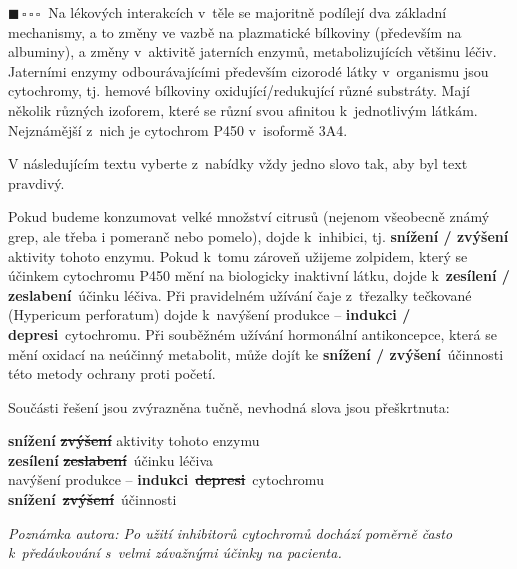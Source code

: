 \documentclass{book}
\newcommand{\jeden}{$\blacksquare \, \square \, \square \, \square \; \; $}
\renewenvironment{quotation}{\par}{\par} %
\begin{document}
\hrulefill %
\begin{quotation}
\jeden Na lékových interakcích v~těle se majoritně podílejí dva základní
mechanismy, a to změny ve vazbě na plazmatické bílkoviny (především
na albuminy), a změny v~aktivitě jaterních enzymů, metabolizujících většinu léčiv. Jaterními enzymy odbourávajícími především cizorodé látky v~organismu jsou cytochromy, tj. hemové bílkoviny oxidující/redukující různé substráty. Mají několik různých izoforem, které se různí svou
afinitou k~jednotlivým látkám. Nejznámější z~nich je cytochrom P450
v~isoformě 3A4. 

V následujícím textu vyberte z~nabídky vždy jedno slovo tak, aby byl text pravdivý.

Pokud budeme konzumovat velké množství citrusů (nejenom všeobecně
známý grep, ale třeba i pomeranč nebo pomelo), dojde k~inhibici, tj. 
\textbf{snížení / zvýšení} aktivity tohoto enzymu.
Pokud k~tomu zároveň užijeme zolpidem, který se účinkem cytochromu
P450 mění na biologicky inaktivní látku, dojde k~\textbf{zesílení
/ zeslabení}\ účinku léčiva. Při pravidelném
užívání čaje z~třezalky tečkované (Hypericum perforatum) dojde k~navýšení
produkce -- \textbf{indukci / depresi}\ cytochromu.
Při souběžném užívání hormonální antikoncepce, která se mění oxidací
na neúčinný metabolit, může dojít ke \textbf{snížení / zvýšení}\ účinnosti této metody ochrany proti početí. 
\end{quotation} \dotfill \par 
Součásti řešení jsou zvýrazněna tučně, nevhodná slova jsou přeškrtnuta:

\textbf{snížení }\textbf{\sout{zvýšení}} aktivity tohoto enzymu\\
\textbf{zesílení }\textbf{\sout{zeslabení}}\ účinku léčiva\\
navýšení produkce -- \textbf{indukci}\ \textbf{\sout{depresi}}\ cytochromu\\
\textbf{snížení}\ \textbf{\sout{zvýšení}}\ účinnosti

\textit{Poznámka autora: Po užití inhibitorů cytochromů dochází poměrně
často k~předávkování s~velmi závažnými účinky na pacienta.}
\end{document}
